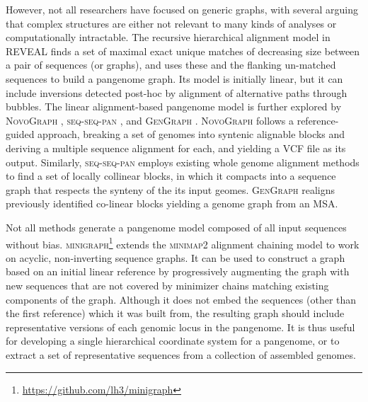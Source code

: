 However, not all researchers have focused on generic graphs, with several arguing that complex structures are either not relevant to many kinds of analyses or computationally intractable. %
The recursive hierarchical alignment model in \textsc{REVEAL} \cite{linthorst2015scalable} finds a set of maximal exact unique matches of decreasing size between a pair of sequences (or graphs), and uses these and the flanking un-matched sequences to build a pangenome graph.
Its model is initially linear, but it can include inversions detected post-hoc by alignment of alternative paths through bubbles.
The linear alignment-based pangenome model is further explored by \textsc{NovoGraph} \cite{Biederstedt2018}, \textsc{seq-seq-pan} \cite{Jandrasits_2018}, and \textsc{GenGraph} \cite{Ambler_2019}.
\textsc{NovoGraph} follows a reference-guided approach, breaking a set of genomes into syntenic alignable blocks and deriving a multiple sequence alignment for each, and yielding a VCF file as its output.
Similarly, \textsc{seq-seq-pan} employs existing whole genome alignment methods to find a set of locally collinear blocks, in which it compacts into a sequence graph that respects the synteny of the its input geomes.
\textsc{GenGraph} realigns previously identified co-linear blocks yielding a genome graph from an MSA.

Not all methods generate a pangenome model composed of all input sequences without bias.
\textsc{minigraph}\footnote{\url{https://github.com/lh3/minigraph}} extends the \textsc{minimap2} \cite{Li_2018} alignment chaining model to work on acyclic, non-inverting sequence graphs.
It can be used to construct a graph based on an initial linear reference by progressively augmenting the graph with new sequences that are not covered by minimizer chains matching existing components of the graph.
Although it does not embed the sequences (other than the first reference) which it was built from, the resulting graph should include representative versions of each genomic locus in the pangenome.
It is thus useful for developing a single hierarchical coordinate system for a pangenome, or to extract a set of representative sequences from a collection of assembled genomes.


